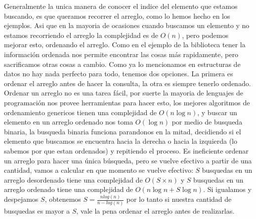 Generalmente la unica manera de conocer el indice del elemento que estamos buscando, es que queramos recorrer el arreglo, como lo hemos hecho en los ejemplos. Asi que en la mayoria de ocasiones cuando buscamos un elemento y no estamos recorriendo el arreglo la complejidad es de $O(n)$, pero podemos mejorar esto, ordenando el arreglo. Como en el ejemplo de la biblioteca tener la información ordenada nos permite encontrar las cosas más rapidamente, pero sacrificamos otras cosas a cambio. Como ya lo mencionamos en estructuras de datos no hay nada perfecto para todo, tenemos dos opciones. La primera es ordenar el arreglo antes de hacer la consulta, la otra es siempre tenerlo ordenado.
Ordenar un arreglo no es una tarea fácil, por suerte la mayoria de lenguajes de programación nos provee herramientas para hacer esto, los mejores algoritmos de ordenamiento genericos tienen una complejidad de $O(n\log{}n)$, y buscar un elemento en un arreglo ordenado nos toma $O(\log{}n)$ por medio de busqueda binaria, la busqueda binaria funciona parandonos en la mitad, decidiendo si el elemento que buscamos se encuentra hacia la derecha o hacia la izquierda (lo sabemos por que estan ordenados) y repitiendo el proceso. 
Es ineficiente ordenar un arreglo para hacer una única búsqueda, pero se vuelve efectivo a partir de una cantidad, vamos a calcular en que momento se vuelve efectivo:
$S$ busquedas en un arreglo desordenado tiene una complejidad de $O(S\times{}n)$ y $S$ busquedas en un arreglo ordenado tiene una complejidad de $O(n\log{}n + S\log{}n)$. Si igualamos y despejamos $S$, obtenemos $S =\frac{nlog(n)}{n-log(n)}$ por lo tanto si nuestra cantidad de busquedas es mayor a $S$, vale la pena ordenar el arreglo antes de realizarlas.